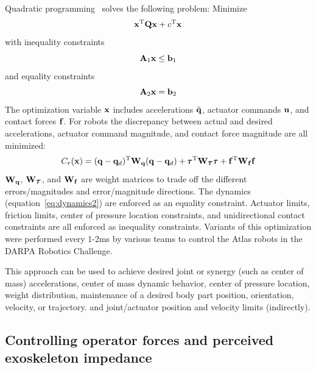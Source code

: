 \documentclass[letterpaper,12pt,fullpage]{article}
\begin{document}
Quadratic programming~\cite{Wikipedia} solves the following problem:
Minimize
\begin{equation}
{\bf x}^{{\rm T}} {\bf Q} {\bf x} + c^{{\rm T}} {\bf x}
\end{equation}
with inequality constraints
\begin{equation}
{\bf A}_1 {\bf x} \le {\bf b}_1
\end{equation}
and equality constraints
\begin{equation}
{\bf A}_2 {\bf x} = {\bf b}_2
\end{equation}
The optimization variable ${\bf x}$ includes accelerations $\ddot{{\bf q}}$, actuator
commands ${\bf u}$, and contact forces ${\bf f}$.
For robots the discrepancy between actual and desired accelerations, actuator command
magnitude, and contact force magnitude are all minimized:
\begin{equation}
C_r(\vx) = (\vq - \vq_d)^{\tr} \mW_{\vq} (\vq - \vq_d) + \vtau^{\tr} \mW_{\vtau} \vtau
+ \vf^{\tr} \mW_{\vf} \vf
\end{equation}
${\bf W}_{{\bf q}}$, $\mW_{\vtau}$, and ${\bf W}_{{\bf f}}$ are weight matrices to trade off the
different errors/magnitudes and error/magnitude directions.
The dynamics (equation~\ref{eq:dynamics2}) are enforced as an equality constraint.
Actuator limits, friction limits, center of pressure location constraints,
and unidirectional contact constraints are all
enforced as inequality constraints.
Variants of this optimization
were performed every 1-2ms by various teams to control the
Atlas robots in the DARPA Robotics Challenge.

This approach can be used to achieve desired joint or synergy (such as center
of mass) accelerations, center of mass dynamic behavior, center of pressure location,
weight distribution, maintenance of a desired body part position, orientation,
velocity, or trajectory. and joint/actuator position and velocity limits (indirectly).

\subsection{Controlling operator forces and perceived exoskeleton impedance}
\end{document}
